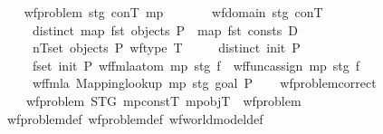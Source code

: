 \begin{isabellebody}
\endisatagproof
{\isafoldproof}%
%
\isadelimproof
\isanewline
%
\endisadelimproof
\isanewline
\ \ \isamarkupfalse%
\ {\isachardoublequoteopen}wf{\isacharunderscore}{\kern0pt}problem{\isacharprime}{\kern0pt}\ stg\ conT\ mp\ {\isasymequiv}\isanewline
\ \ \ \ \ \ wf{\isacharunderscore}{\kern0pt}domain{\isacharprime}{\kern0pt}\ stg\ conT\isanewline
\ \ \ \ {\isasymand}\ distinct\ {\isacharparenleft}{\kern0pt}map\ fst\ {\isacharparenleft}{\kern0pt}objects\ P{\isacharparenright}{\kern0pt}\ {\isacharat}{\kern0pt}\ map\ fst\ {\isacharparenleft}{\kern0pt}consts\ D{\isacharparenright}{\kern0pt}{\isacharparenright}{\kern0pt}\isanewline
\ \ \ \ {\isasymand}\ {\isacharparenleft}{\kern0pt}{\isasymforall}{\isacharparenleft}{\kern0pt}n{\isacharcomma}{\kern0pt}T{\isacharparenright}{\kern0pt}{\isasymin}set\ {\isacharparenleft}{\kern0pt}objects\ P{\isacharparenright}{\kern0pt}{\isachardot}{\kern0pt}\ wf{\isacharunderscore}{\kern0pt}type\ T{\isacharparenright}{\kern0pt}\isanewline
\ \ \ \ {\isasymand}\ distinct\ {\isacharparenleft}{\kern0pt}init\ P{\isacharparenright}{\kern0pt}\isanewline
\ \ \ \ {\isasymand}\ {\isacharparenleft}{\kern0pt}{\isasymforall}f{\isasymin}set\ {\isacharparenleft}{\kern0pt}init\ P{\isacharparenright}{\kern0pt}{\isachardot}{\kern0pt}\ wf{\isacharunderscore}{\kern0pt}fmla{\isacharunderscore}{\kern0pt}atom{}{\isacharprime}{\kern0pt}\ mp\ stg\ f\ {\isasymor}\ wf{\isacharunderscore}{\kern0pt}func{\isacharunderscore}{\kern0pt}assign{\isacharprime}{\kern0pt}\ mp\ stg\ f{\isacharparenright}{\kern0pt}\isanewline
\ \ \ \ {\isasymand}\ wf{\isacharunderscore}{\kern0pt}fmla{\isacharprime}{\kern0pt}\ {\isacharparenleft}{\kern0pt}Mapping{\isachardot}{\kern0pt}lookup\ mp{\isacharparenright}{\kern0pt}\ stg\ {\isacharparenleft}{\kern0pt}goal\ P{\isacharparenright}{\kern0pt}{\isachardoublequoteclose}\isanewline
\isanewline
\ \ \isamarkupfalse%
\ wf{\isacharunderscore}{\kern0pt}problem{\isacharprime}{\kern0pt}{\isacharunderscore}{\kern0pt}correct{\isacharcolon}{\kern0pt}\isanewline
\ \ \ \ {\isachardoublequoteopen}wf{\isacharunderscore}{\kern0pt}problem{\isacharprime}{\kern0pt}\ STG\ mp{\isacharunderscore}{\kern0pt}constT\ mp{\isacharunderscore}{\kern0pt}objT\ {\isacharequal}{\kern0pt}\ wf{\isacharunderscore}{\kern0pt}problem{\isachardoublequoteclose}\isanewline
%
\isadelimproof
\ \ \ \ %
\endisadelimproof
%
\isatagproof
{}\isamarkupfalse%
\ wf{\isacharunderscore}{\kern0pt}problem{\isacharunderscore}{\kern0pt}def\ wf{\isacharunderscore}{\kern0pt}problem{\isacharprime}{\kern0pt}{\isacharunderscore}{\kern0pt}def\ wf{\isacharunderscore}{\kern0pt}world{\isacharunderscore}{\kern0pt}model{\isacharunderscore}{\kern0pt}def\isanewline

\end{isabellebody}
